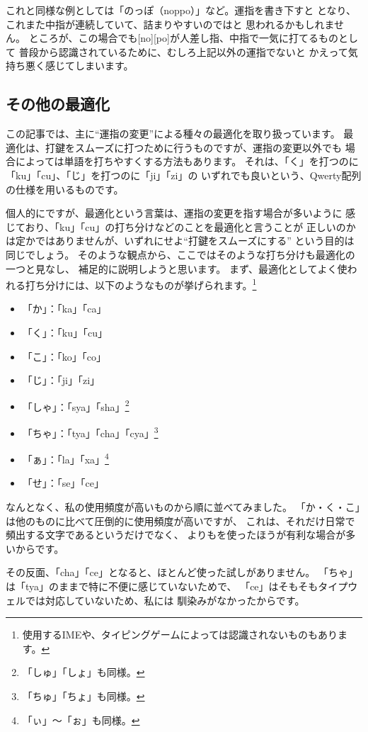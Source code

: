 これと同様な例としては「のっぽ（noppo）」など。運指を書き下すと
となり、これまた中指が連続していて、詰まりやすいのではと
思われるかもしれません。
ところが、この場合でも[no][po]が人差し指、中指で一気に打てるものとして
普段から認識されているために、むしろ上記以外の運指でないと
かえって気持ち悪く感じてしまいます。



\subsection{その他の最適化}

この記事では、主に“運指の変更”による種々の最適化を取り扱っています。
最適化は、打鍵をスムーズに打つために行うものですが、運指の変更以外でも
場合によっては単語を打ちやすくする方法もあります。
それは、「く」を打つのに「ku」「cu」、「じ」を打つのに「ji」「zi」の
いずれでも良いという、Qwerty配列の仕様を用いるものです。

個人的にですが、最適化という言葉は、運指の変更を指す場合が多いように
感じており、「ku」「cu」の打ち分けなどのことを最適化と言うことが
正しいのかは定かではありませんが、いずれにせよ“打鍵をスムーズにする”
という目的は同じでしょう。
そのような観点から、ここではそのような打ち分けも最適化の一つと見なし、
補足的に説明しようと思います。
まず、最適化としてよく使われる打ち分けには、以下のようなものが挙げられます。\footnote{使用するIMEや、タイピングゲームによっては認識されないものもあります。}
\begin{itemize}
 \item 「か」：「ka」「ca」
 \item 「く」：「ku」「cu」
 \item 「こ」：「ko」「co」
 \item 「じ」：「ji」「zi」
 \item 「しゃ」：「sya」「sha」\footnote{「しゅ」「しょ」も同様。}
 \item 「ちゃ」：「tya」「cha」「cya」\footnote{「ちゅ」「ちょ」も同様。}
 \item 「ぁ」：「la」「xa」\footnote{「ぃ」～「ぉ」も同様。}
 \item 「せ」：「se」「ce」
\end{itemize}

なんとなく、私の使用頻度が高いものから順に並べてみました。
「か・く・こ」は他のものに比べて圧倒的に使用頻度が高いですが、
これは、それだけ日常で頻出する文字であるというだけでなく、
よりもを使ったほうが有利な場合が多いからです。

その反面、「cha」「ce」となると、ほとんど使った試しがありません。
「ちゃ」は「tya」のままで特に不便に感じていないためで、
「ce」はそもそもタイプウェルでは対応していないため、私には
馴染みがなかったからです。

